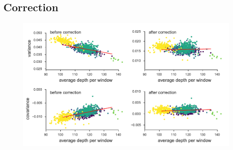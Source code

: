 \documentclass[11pt]{article}
\begin{document}
\subsection{Correction}
\begin{figure}[!ht]
  \centering
  \includegraphics[]{figures/barghi-correction-plot.pdf}
  \caption{}
  \label{suppfig:correction}
\end{figure}
\end{document}
